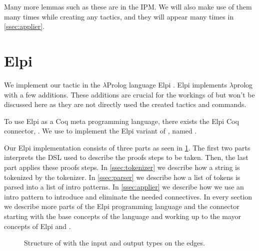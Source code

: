 \documentclass[thesis.tex]{subfiles}
\begin{document}
{Many more lemmas such as these are in the IPM. We will also make use of them many times while creating any tactics, and they will appear many times in \cref{ssec:applier}.

\section{Elpi}\label{sec:elpi}
We implement our tactic in the $\lambda$Prolog language Elpi \cite{dunchevELPIFastEmbeddable2015,guidiImplementingTypeTheory2019}. Elpi implements $\lambda$prolog \cite{millerHigherorderLogicProgramming1986,millerUniformProofsFoundation1991,belleanneePragmaticReconstructionLProlog1999,millerProgrammingHigherOrderLogic2012} with a few additions. These additions are crucial for the workings of \ce but won't be discussed here as they are not directly used the created tactics and commands.

To use Elpi as a Coq meta programming language, there exists the Elpi Coq connector, \ce \cite{tassiElpiExtensionLanguage2018}. We use \ce to implement the Elpi variant of , named .

Our Elpi implementation  consists of three parts as seen in \cref{fig:eiintrosstruct}. The first two parts interprets the DSL used to describe the proofs steps to be taken. Then, the last part applies these proofs steps. In \cref{ssec:tokenizer} we describe how a string is tokenized by the tokenizer. In \cref{ssec:parser} we describe how a list of tokens is parsed into a list of intro patterns. In \cref{ssec:applier} we describe how we use an intro pattern to introduce and eliminate the needed connectives. In every section we describe more parts of the Elpi programming language and the \ce connector starting with the base concepts of the language and working up to the mayor concepts of Elpi and \ce.
\begin{figure}
    \centering
    \caption{Structure of  with the input and output types on the edges.}
    \label{fig:eiintrosstruct}
\end{figure}

}
\end{document}
